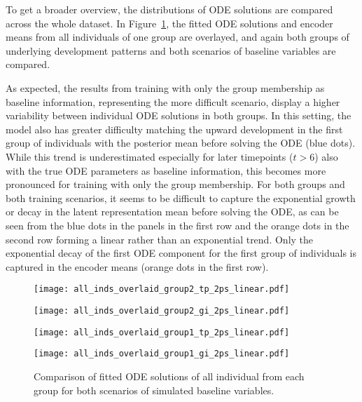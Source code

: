 To get a broader overview, the distributions of ODE solutions are compared across the whole dataset. In Figure~\ref{fig:apps_allinds_comparison_tp_gi_2pslinear}, the fitted ODE solutions and encoder means from all individuals of one group are overlayed, and again both groups of underlying development patterns and both scenarios of baseline variables are compared. 

As expected, the results from training with only the group membership as baseline information, representing the more difficult scenario, display a higher variability between individual ODE solutions in both groups. 
In this setting, the model also has greater difficulty matching the upward development in the first group of individuals with the posterior mean before solving the ODE (blue dots). While this trend is underestimated especially for later timepoints ($t>6$) also with the true ODE parameters as baseline information, this becomes more pronounced for training with only the group membership. For both groups and both training scenarios, it seems to be difficult to capture the exponential growth or decay in the latent representation mean before solving the ODE, as can be seen from the blue dots in the panels in the first row and the orange dots in the second row forming a linear rather than an exponential trend. Only the exponential decay of the first ODE component for the first group of individuals is captured in the encoder means (orange dots in the first row).

\begin{figure}
	\centering
	\begin{minipage}{\linewidth}
		\begin{minipage}{.5\textwidth}
			\centering				\texttt{[image: all\_inds\_overlaid\_group2\_tp\_2ps\_linear.pdf]}
		\end{minipage}\begin{minipage}{.5\textwidth}
			\centering
			\texttt{[image: all\_inds\_overlaid\_group2\_gi\_2ps\_linear.pdf]}
		\end{minipage}
	\end{minipage}
	\begin{minipage}{\linewidth}
		\begin{minipage}{.5\textwidth}
			\centering
			\texttt{[image: all\_inds\_overlaid\_group1\_tp\_2ps\_linear.pdf]}
		\end{minipage}\begin{minipage}{.5\textwidth}
			\centering
			\texttt{[image: all\_inds\_overlaid\_group1\_gi\_2ps\_linear.pdf]}
		\end{minipage}
	\end{minipage}
	\caption{Comparison of fitted ODE solutions of all individual from each group for both scenarios of simulated baseline variables.}
	\label{fig:apps_allinds_comparison_tp_gi_2pslinear}
\end{figure}

